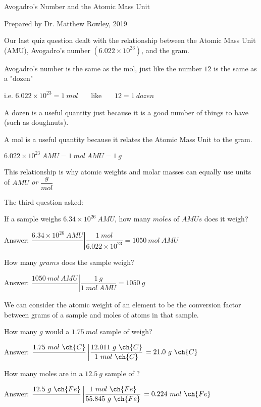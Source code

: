 \documentclass[12pt, openany, letterpaper]{memoir}
\begin{document}
\begin{center}
{\Large Avogadro's Number and the Atomic Mass Unit}

Prepared by Dr. Matthew Rowley, 2019
\end{center}

\noindent
Our last quiz question dealt with the relationship between the Atomic Mass Unit (AMU), Avogadro's number $\left(6.022\times10^{23}\right)$, and the gram.

Avogadro's number is the same as the mol, just like the number $12$ is the same as a "dozen"

i.e. $6.022\times10^{23}=1~mol$ ~~~like~~~ $12=1~dozen$

A dozen is a useful quantity just because it is a good number of things to have (such as doughnuts).

A mol is a useful quantity because it relates the Atomic Mass Unit to the gram. 

$6.022\times10^{23}~AMU=1~mol~AMU=1~g$

This relationship is why atomic weights and molar masses can equally use units of $AMU$ \emph{or} $\dfrac{g}{mol}$

The third question asked:

\vspace{1em}
If a sample weighs $6.34\times10^{26}~AMU$, how many $moles$ of $AMUs$ does it weigh?

\color{blue}
Answer: $\dfrac{6.34\times10^{26}~AMU}{}\left|\dfrac{1~mol}{6.022\times10^{23}}\right.= 1050~mol~AMU$

\color{black}
\vspace{1em}
How many $grams$ does the sample weigh?

\color{blue}
Answer: $\dfrac{1050~mol~AMU}{}\left|\dfrac{1~g}{1~mol~AMU}\right.= 1050~g$

\color{black}
\vspace{1em}\noindent
We can consider the atomic weight of an element to be the conversion factor between grams of a sample and moles of atoms in that sample.

How many $g$ would a $1.75~mol$ sample of  weigh?

\color{blue}
Answer: $\dfrac{1.75~mol~\ch{C}}{}\left|\dfrac{12.011~g~\ch{C}}{1~mol~\ch{C}}\right.= 21.0~g~\ch{C}$

\vspace{1em}
\color{black}
How many moles are in a $12.5~g$ sample of ?

\color{blue}
Answer: $\dfrac{12.5~g~\ch{Fe}}{}\left|\dfrac{1~mol~\ch{Fe}}{55.845~g~\ch{Fe}}\right.= 0.224~mol~\ch{Fe}$
\end{document}
